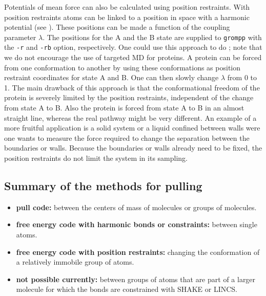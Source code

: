Potentials of mean force can also be calculated using position restraints.
With position restraints atoms can be linked to a position in space
with a harmonic potential (see ).
These positions can be made a function of the coupling parameter $\lambda$.
The positions for the A and the B state are supplied to {\tt grompp} with
the {\tt -r} and {\tt -rb} option, respectively.
One could use this approach to do ;
note that we do not encourage the use of targeted MD for proteins.
A protein can be forced from one conformation to another by using
these conformations as position restraint coordinates for state A and B.
One can then slowly change $\lambda$ from 0 to 1.
The main drawback of this approach is that the conformational freedom
of the protein is severely limited by the position restraints,
independent of the change from state A to B.
Also the protein is forced from state A to B in an almost straight line,
whereas the real pathway might be very different.
An example of a more fruitful application is a solid system or a liquid
confined between walls were one wants to measure the force required
to change the separation between the boundaries or walls.
Because the boundaries or walls already need to be fixed,
the position restraints do not limit the system in its sampling.

\subsection{Summary of the methods for pulling}
\begin{itemize}
\item{\bf pull code:} between the centers of mass of molecules or groups of molecules.
\item{\bf free energy code with harmonic bonds or constraints:} between single atoms. 
\item{\bf free energy code with position restraints:} changing the conformation of a relatively immobile group of atoms.
\item{\bf not possible currently:} between groups of atoms that are
part of a larger molecule for which the bonds are constrained with
SHAKE or LINCS.
\end{itemize}

\newcommand{\amine}{\sf -NH$_2$}
\newcommand{\amines}{\sf -NH-}
\newcommand{\aminep}{\sf -NH$_3^+$}
